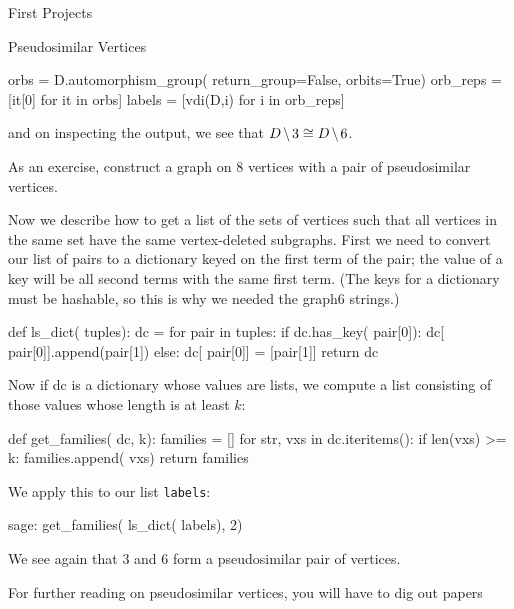 \begin{chap}{First Projects}
\begin{sect}{Pseudosimilar Vertices}
\begin{para}
\end{para}
%
\begin{sageblock}
    orbs = D.automorphism_group( return_group=False, orbits=True)
    orb_reps = [it[0] for it in orbs]
    labels = [vdi(D,i) for i in orb_reps]
\end{sageblock}
%
\begin{para}
and on inspecting the output, we see that $D\mathbin{\mkern-1.5mu\setminus\mkern-1.5mu} 3\cong D\mathbin{\mkern-1.5mu\setminus\mkern-1.5mu} 6$.
\end{para}
%
\begin{para}
As an exercise, construct a graph on 8 vertices with a pair of pseudosimilar
vertices.
\end{para}
%
\begin{para}
Now we describe how to get a list of the sets of vertices such that all
vertices in the same set have the same vertex-deleted subgraphs.
First we need to convert our list of pairs to a dictionary keyed on the 
first term of the pair; the value of a key will be all second terms 
with the same first term. (The keys for a dictionary must be hashable, so this
is why we needed the graph6 strings.)
\end{para}
%
\begin{sageblock}
def ls_dict( tuples):
    dc = {} 
    for pair in tuples:
        if dc.has_key( pair[0]):
            dc[ pair[0]].append(pair[1])
        else:
            dc[ pair[0]] = [pair[1]]
    return dc
\end{sageblock}
%
\begin{para}
Now if dc is a dictionary whose values are lists, we compute a list consisting
of those values whose length is at least $k$:
\end{para}
%
\begin{sageblock}
def get_families( dc, k):
    families = []
    for str, vxs in dc.iteritems():
        if len(vxs) >= k:
            families.append( vxs)
    return families
\end{sageblock}
%
\begin{para}
We apply this to our list \texttt{labels}:
\end{para}
%
\begin{sageexample}
    sage: get_families( ls_dict( labels), 2)
\end{sageexample}
%
\begin{para}
We see again that 3 and 6 form a pseudosimilar pair of vertices.
\end{para}
%
\begin{para}
For further reading on pseudosimilar vertices, you will have to dig out papers

\end{para}
\end{sect}
\end{chap}
